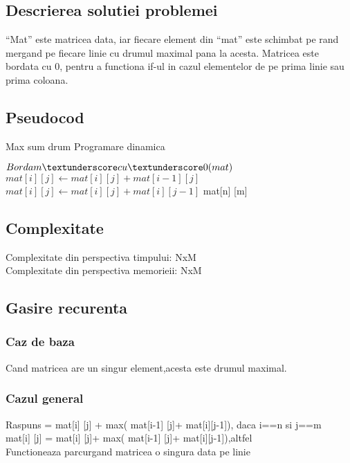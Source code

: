 \documentclass[runningheads]{llncs}
\begin{document}
\subsection{Descrierea solutiei problemei}
“Mat” este matricea data, iar fiecare element  din “mat” este schimbat pe rand mergand pe fiecare linie cu drumul maximal pana la acesta. Matricea este bordata cu 0, pentru a functiona if-ul in cazul elementelor de pe prima linie sau prima coloana.
\subsection{Pseudocod}
\begin{algorithm}
\caption{Max sum drum Programare dinamica}\label{euclid}
\begin{algorithmic}[1]
\State $Bordam\textunderscore cu \textunderscore 0(mat)$
 \State $mat [i] [j] \gets mat[i] [j] + mat[i-1] [j]$
\Else 
\State $mat[i] [j] \gets mat[i] [j] + mat[i] [j -1]$
\EndIf
\EndFor
\EndFor
\Return mat[n] [m]
\EndProcedure
\end{algorithmic}
\end{algorithm}
\subsection{Complexitate }
Complexitate din perspectiva timpului: NxM\\
Complexitate din perspectiva memorieii: NxM\\
\subsection{Gasire recurenta}
\subsubsection{Caz de baza}
Cand matricea are un singur element,acesta este drumul maximal.
\subsubsection{Cazul general}
Raspuns = mat[i] [j] + max( mat[i-1] [j]+ mat[i][j-1]), daca i==n si j==m\\
mat[i] [j] = mat[i] [j]+ max( mat[i-1] [j]+ mat[i][j-1]),altfel\\
Functioneaza parcurgand matricea o singura data pe linie\\
\end{document}
